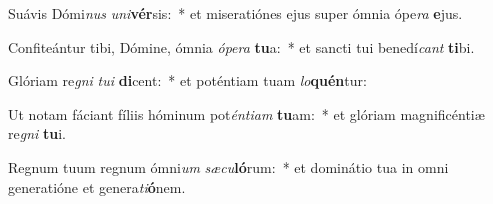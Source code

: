 \item Suávis Dómi\textit{nus} \textit{u}\textit{ni}\textbf{vér}sis:~* et miseratiónes ejus super ómnia ópe\textit{ra} \textbf{e}jus.
\item Confiteántur tibi, Dómine, ómnia \textit{ó}\textit{pe}\textit{ra} \textbf{tu}a:~* et sancti tui benedí\textit{cant} \textbf{ti}bi.
\item Glóriam re\textit{gni} \textit{tu}\textit{i} \textbf{di}cent:~* et poténtiam tuam \textit{lo}\textbf{quén}tur:
\item Ut notam fáciant fíliis hóminum pot\textit{én}\textit{ti}\textit{am} \textbf{tu}am:~* et glóriam magnificéntiæ re\textit{gni} \textbf{tu}i.
\item Regnum tuum regnum ómni\textit{um} \textit{sæ}\textit{cu}\textbf{ló}rum:~* et dominátio tua in omni generatióne et genera\textit{ti}\textbf{ó}nem.

